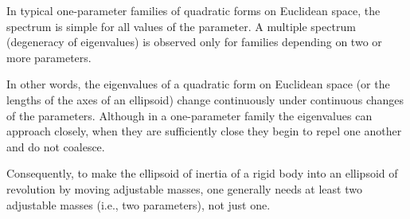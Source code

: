In typical one-parameter families of quadratic forms on Euclidean space, the spectrum is simple for all values of the parameter. A multiple spectrum (degeneracy of eigenvalues) is observed only for families depending on two or more parameters.

In other words, the eigenvalues of a quadratic form on Euclidean space (or the lengths of the axes of an ellipsoid) change continuously under continuous changes of the parameters. Although in a one-parameter family the eigenvalues can approach closely, when they are sufficiently close they begin to repel one another and do not coalesce.

Consequently, to make the ellipsoid of inertia of a rigid body into an ellipsoid of revolution by moving adjustable masses, one generally needs at least two adjustable masses (i.e., two parameters), not just one.
